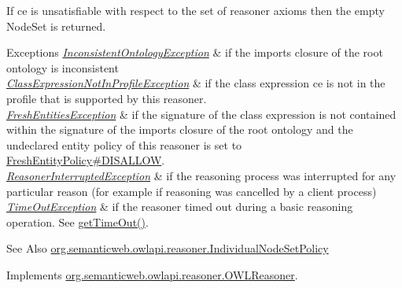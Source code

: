 If ce is unsatisfiable with respect to the set of reasoner axioms then the empty {\ttfamily Node\-Set} is returned. 
\begin{DoxyExceptions}{Exceptions}
{\em \hyperlink{classorg_1_1semanticweb_1_1owlapi_1_1reasoner_1_1_inconsistent_ontology_exception}{Inconsistent\-Ontology\-Exception}} & if the imports closure of the root ontology is inconsistent \\
\hline
{\em \hyperlink{classorg_1_1semanticweb_1_1owlapi_1_1reasoner_1_1_class_expression_not_in_profile_exception}{Class\-Expression\-Not\-In\-Profile\-Exception}} & if the class expression {\ttfamily ce} is not in the profile that is supported by this reasoner. \\
\hline
{\em \hyperlink{classorg_1_1semanticweb_1_1owlapi_1_1reasoner_1_1_fresh_entities_exception}{Fresh\-Entities\-Exception}} & if the signature of the class expression is not contained within the signature of the imports closure of the root ontology and the undeclared entity policy of this reasoner is set to \hyperlink{enumorg_1_1semanticweb_1_1owlapi_1_1reasoner_1_1_fresh_entity_policy_a762eae6d5b2449d125311ecaabfdc8d0}{Fresh\-Entity\-Policy\#\-D\-I\-S\-A\-L\-L\-O\-W}. \\
\hline
{\em \hyperlink{classorg_1_1semanticweb_1_1owlapi_1_1reasoner_1_1_reasoner_interrupted_exception}{Reasoner\-Interrupted\-Exception}} & if the reasoning process was interrupted for any particular reason (for example if reasoning was cancelled by a client process) \\
\hline
{\em \hyperlink{classorg_1_1semanticweb_1_1owlapi_1_1reasoner_1_1_time_out_exception}{Time\-Out\-Exception}} & if the reasoner timed out during a basic reasoning operation. See \hyperlink{classorg_1_1semanticweb_1_1owlapi_1_1reasoner_1_1impl_1_1_o_w_l_reasoner_base_af55342eaaabb1b72dacfde7a181b93d2}{get\-Time\-Out()}. \\
\hline
\end{DoxyExceptions}
\begin{DoxySeeAlso}{See Also}
\hyperlink{enumorg_1_1semanticweb_1_1owlapi_1_1reasoner_1_1_individual_node_set_policy}{org.\-semanticweb.\-owlapi.\-reasoner.\-Individual\-Node\-Set\-Policy} 
\end{DoxySeeAlso}


Implements \hyperlink{interfaceorg_1_1semanticweb_1_1owlapi_1_1reasoner_1_1_o_w_l_reasoner_a8bbe84b91ee32baa0ad239d8eae8841e}{org.\-semanticweb.\-owlapi.\-reasoner.\-O\-W\-L\-Reasoner}.

